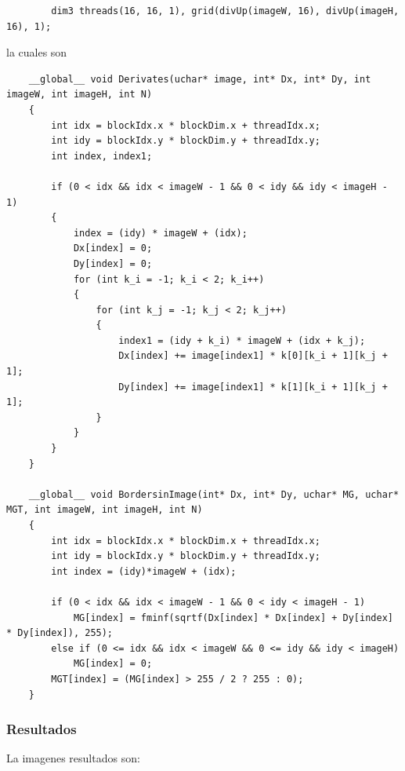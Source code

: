 \documentclass[letterpaper]{article}
\theoremstyle{definition}
\theoremstyle{lemathm}
\theoremstyle{lemathm}
\theoremstyle{lemathm}
\theoremstyle{lemademthm}
\newcommand{\1}{\mathbbm{1}}
\begin{document}
\begin{enumerate}
		\begin{verbatim}
		dim3 threads(16, 16, 1), grid(divUp(imageW, 16), divUp(imageH, 16), 1);
		\end{verbatim}
		
		la cuales son

		\begin{verbatim}
	__global__ void Derivates(uchar* image, int* Dx, int* Dy, int imageW, int imageH, int N) 
	{
		int idx = blockIdx.x * blockDim.x + threadIdx.x;
		int idy = blockIdx.y * blockDim.y + threadIdx.y;
		int index, index1;

		if (0 < idx && idx < imageW - 1 && 0 < idy && idy < imageH - 1)
		{
			index = (idy) * imageW + (idx);
			Dx[index] = 0;
			Dy[index] = 0;
			for (int k_i = -1; k_i < 2; k_i++)
			{
				for (int k_j = -1; k_j < 2; k_j++)
				{
					index1 = (idy + k_i) * imageW + (idx + k_j);
					Dx[index] += image[index1] * k[0][k_i + 1][k_j + 1];
					Dy[index] += image[index1] * k[1][k_i + 1][k_j + 1];
				}
			}
		}
	}

	__global__ void BordersinImage(int* Dx, int* Dy, uchar* MG, uchar* MGT, int imageW, int imageH, int N)
	{
		int idx = blockIdx.x * blockDim.x + threadIdx.x;
		int idy = blockIdx.y * blockDim.y + threadIdx.y;
		int index = (idy)*imageW + (idx);

		if (0 < idx && idx < imageW - 1 && 0 < idy < imageH - 1)
			MG[index] = fminf(sqrtf(Dx[index] * Dx[index] + Dy[index] * Dy[index]), 255);
		else if (0 <= idx && idx < imageW && 0 <= idy && idy < imageH)
			MG[index] = 0;
		MGT[index] = (MG[index] > 255 / 2 ? 255 : 0);
	}
		\end{verbatim}
	\end{enumerate}

	\subsubsection*{Resultados}

	La imagenes resultados son:
\end{document}

